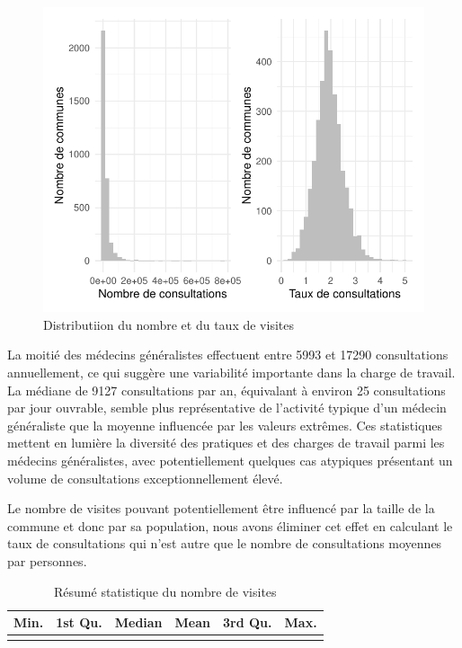 \documentclass[
]{article}
\begin{document}
\begin{figure}

{\centering \includegraphics{rapport_intermediaire_files/figure-latex/unnamed-chunk-19-1} 

}

\caption{Distributiion du nombre et du taux de visites}\label{fig:unnamed-chunk-19}
\end{figure}

La moitié des médecins généralistes effectuent entre 5993 et 17290
consultations annuellement, ce qui suggère une variabilité importante
dans la charge de travail. La médiane de 9127 consultations par an,
équivalant à environ 25 consultations par jour ouvrable, semble plus
représentative de l'activité typique d'un médecin généraliste que la
moyenne influencée par les valeurs extrêmes. Ces statistiques mettent en
lumière la diversité des pratiques et des charges de travail parmi les
médecins généralistes, avec potentiellement quelques cas atypiques
présentant un volume de consultations exceptionnellement élevé.

Le nombre de visites pouvant potentiellement être influencé par la
taille de la commune et donc par sa population, nous avons éliminer cet
effet en calculant le taux de consultations qui n'est autre que le
nombre de consultations moyennes par personnes.

\begin{table}[H]
\centering
\caption{\label{tab:unnamed-chunk-20}Résumé statistique du nombre de visites}
\centering
\begin{tabular}[t]{rrrrrr}
\toprule
Min. & 1st Qu. & Median & Mean & 3rd Qu. & Max.\\
\midrule
\cellcolor{gray!10}{1037} & \cellcolor{gray!10}{5993} & \cellcolor{gray!10}{9127} & \cellcolor{gray!10}{19129.63} & \cellcolor{gray!10}{17290} & \cellcolor{gray!10}{765833}\\
\bottomrule
\end{tabular}
\end{table}
\end{document}
